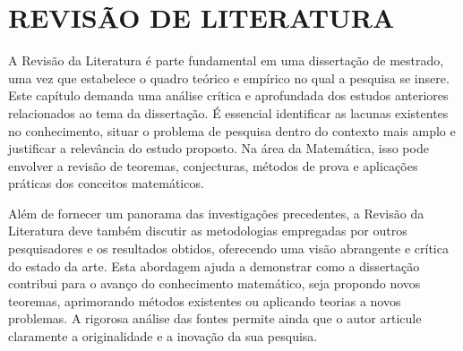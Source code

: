 
\chapter{REVISÃO DE LITERATURA}

A Revisão da Literatura é parte fundamental em uma dissertação de mestrado, uma vez que estabelece o quadro teórico e empírico no qual a pesquisa se insere. Este capítulo demanda uma análise crítica e aprofundada dos estudos anteriores relacionados ao tema da dissertação. É essencial identificar as lacunas existentes no conhecimento, situar o problema de pesquisa dentro do contexto mais amplo e justificar a relevância do estudo proposto. Na área da Matemática, isso pode envolver a revisão de teoremas, conjecturas, métodos de prova e aplicações práticas dos conceitos matemáticos.

Além de fornecer um panorama das investigações precedentes, a Revisão da Literatura deve também discutir as metodologias empregadas por outros pesquisadores e os resultados obtidos, oferecendo uma visão abrangente e crítica do estado da arte. Esta abordagem ajuda a demonstrar como a dissertação contribui para o avanço do conhecimento matemático, seja propondo novos teoremas, aprimorando métodos existentes ou aplicando teorias a novos problemas. A rigorosa análise das fontes permite ainda que o autor articule claramente a originalidade e a inovação da sua pesquisa.